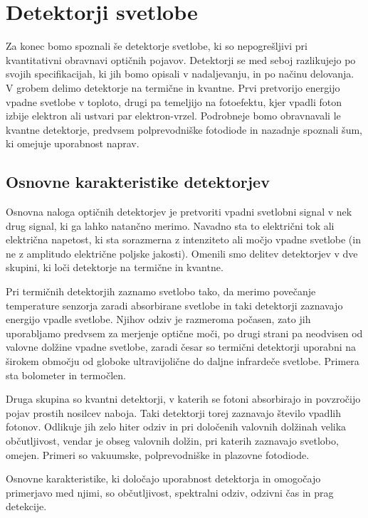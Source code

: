
\chapter{Detektorji svetlobe}

Za konec bomo spoznali še detektorje svetlobe, ki so nepogrešljivi
pri kvantitativni obravnavi optičnih pojavov. Detektorji se med seboj razlikujejo
po svojih specifikacijah, ki jih bomo opisali v nadaljevanju, in po načinu delovanja. 
V grobem delimo detektorje na termične in kvantne. Prvi pretvorijo energijo vpadne svetlobe 
v toploto, drugi pa temeljijo na fotoefektu, kjer vpadli foton izbije elektron ali 
ustvari par elektron-vrzel. Podrobneje bomo obravnavali le kvantne detektorje, 
predvsem polprevodniške fotodiode in nazadnje spoznali šum, ki omejuje uporabnost naprav.

\section{Osnovne karakteristike detektorjev}

Osnovna naloga optičnih detektorjev je pretvoriti vpadni svetlobni signal 
v nek drug signal, ki ga lahko natančno merimo. Navadno sta to električni tok 
ali električna napetost, ki sta sorazmerna z intenziteto ali močjo vpadne svetlobe 
(in ne z amplitudo električne poljske jakosti). Omenili smo delitev detektorjev v dve skupini, 
ki loči detektorje na termične in kvantne. 

Pri termičnih detektorjih zaznamo svetlobo tako,
da merimo povečanje temperature senzorja zaradi absorbirane svetlobe in taki detektorji
zaznavajo energijo vpadle svetlobe. Njihov odziv je razmeroma počasen, zato jih uporabljamo
predvsem za merjenje optične moči, po drugi strani pa neodvisen
od valovne dolžine vpadne svetlobe, zaradi česar so termični detektorji uporabni na 
širokem območju od globoke ultravijolične do daljne infrardeče svetlobe. Primera sta
bolometer in termočlen.

Druga skupina so kvantni detektorji, v katerih se
fotoni absorbirajo in povzročijo pojav prostih nosilcev naboja. Taki detektorji
torej zaznavajo število vpadlih fotonov. Odlikuje jih zelo hiter odziv in pri določenih 
valovnih dolžinah velika občutljivost, vendar je obseg valovnih dolžin, pri katerih
zaznavajo svetlobo, omejen. Primeri so vakuumske, polprevodniške in plazovne fotodiode.

Osnovne karakteristike, ki določajo uporabnost detektorja in omogočajo primerjavo med njimi, 
so občutljivost, spektralni odziv, odzivni čas in prag detekcije. 

